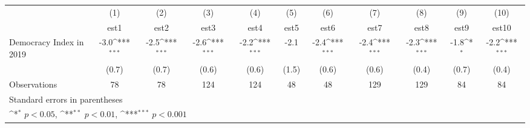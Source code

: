 {
\def\sym#1{\ifmmode^{#1}\else\(^{#1}\)\fi}
\begin{tabular}{l*{10}{c}}
\hline\hline
                    &\multicolumn{1}{c}{(1)}         &\multicolumn{1}{c}{(2)}         &\multicolumn{1}{c}{(3)}         &\multicolumn{1}{c}{(4)}         &\multicolumn{1}{c}{(5)}         &\multicolumn{1}{c}{(6)}         &\multicolumn{1}{c}{(7)}         &\multicolumn{1}{c}{(8)}         &\multicolumn{1}{c}{(9)}         &\multicolumn{1}{c}{(10)}         \\
                    &        est1         &        est2         &        est3         &        est4         &        est5         &        est6         &        est7         &        est8         &        est9         &       est10         \\
\hline
Democracy Index in 2019&        -3.0\sym{***}&        -2.5\sym{***}&        -2.6\sym{***}&        -2.2\sym{***}&        -2.1         &        -2.4\sym{***}&        -2.4\sym{***}&        -2.3\sym{***}&        -1.8\sym{*}  &        -2.2\sym{***}\\
                    &       (0.7)         &       (0.7)         &       (0.6)         &       (0.6)         &       (1.5)         &       (0.6)         &       (0.6)         &       (0.4)         &       (0.7)         &       (0.4)         \\
\hline
Observations        &          78         &          78         &         124         &         124         &          48         &          48         &         129         &         129         &          84         &          84         \\
\hline\hline
\multicolumn{11}{l}{\footnotesize Standard errors in parentheses}\\
\multicolumn{11}{l}{\footnotesize \sym{*} \(p<0.05\), \sym{**} \(p<0.01\), \sym{***} \(p<0.001\)}\\
\end{tabular}
}
